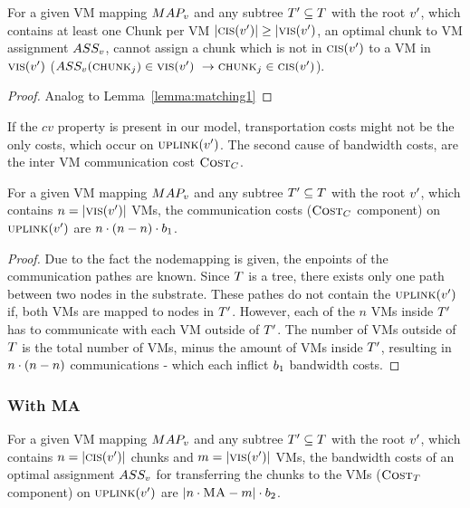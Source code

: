 \begin{lemma}
\label{lemma:matching2}
For a given VM mapping $MAP_v$ and any subtree $T' \subseteq 
T$ with the root $v'$, which contains at least one Chunk per 
VM $|\textsc{cis}(v')| \geq |\textsc{vis}(v')$, an 
optimal chunk to VM assignment $ASS_v$, cannot assign a chunk 
which is not in $\textsc{cis}(v')$ to a VM in 
$\textsc{vis}(v')$ ($ASS_v(\textsc{chunk}_j) \in 
\textsc{vis}(v')~ \rightarrow \textsc{chunk}_j \in 
\textsc{cis}(v')$).
\end{lemma}

\begin{proof}
 Analog to Lemma~\ref{lemma:matching1}
\end{proof}

If the $cv$ property is present in our model, transportation costs might not be 
the only costs, which occur on $\textsc{uplink}(v')$. The second cause of 
bandwidth costs, are the inter VM communication cost $\textsc{Cost}_C$.

\begin{corollary}
\label{corollary:comCost}
 For a given VM mapping $MAP_v$ and any subtree $T' \subseteq 
T$ with the root $v'$, which contains $n 
= |\textsc{vis}(v')|$ VMs, the communication costs ($\textsc{Cost}_C$ 
component) on 
$\textsc{uplink}(v')$ are $n \cdot (n - n) 
\cdot 
b_1$.
\end{corollary}

\begin{proof}
Due to the fact the nodemapping is given, the enpoints of the communication 
pathes are known. Since $T$ is a tree, there exists only one path between 
two nodes in the substrate. These pathes do not contain the 
$\textsc{uplink}(v')$ if, both VMs are mapped to nodes in $T'$. 
However, each of the $n$ VMs inside $T'$ has to communicate with each VM 
outside of $T'$. The number of VMs outside of $T$ is the total number 
of VMs, minus the amount of VMs inside $T'$, resulting in $n \cdot (n - 
n)$ communications - which each inflict $b_1$ bandwidth costs.
\end{proof}

\subsubsection{With MA}

\begin{corollary}
\label{corollary:local_matching}
For a given VM mapping $MAP_v$ and any subtree $T' \subseteq 
T$ with the root $v'$, which contains $n = 
|\textsc{cis}(v')|$ chunks and $m = |\textsc{vis}(v')|$ 
VMs, the bandwidth costs of an optimal assignment $ASS_v$ for 
transferring the chunks to the VMs ($\textsc{Cost}_T$ 
component) on $\textsc{uplink}(v')$ are $|n\cdot\textsc{MA} 
- m| \cdot b_2$.
\end{corollary}

